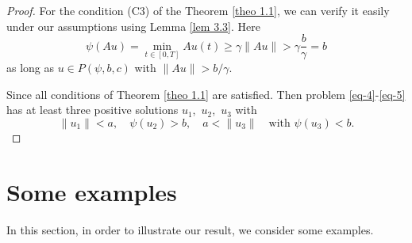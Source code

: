 \documentclass[reqno]{amsart}\usepackage{amsmath}
\begin{document}
\begin{proof}
For the condition {\rm (C3)} of the Theorem \ref{theo 1.1}, we can verify
it easily under our assumptions using Lemma \ref{lem 3.3}. Here
$$
\psi(Au)=\min_{t\in [0, T]} Au(t) \ge \gamma\|Au\|
        > \gamma \frac b\gamma = b
$$
as long as $u\in P(\psi, b, c)$ with $\|Au\|>b/\gamma$.

Since all conditions of Theorem \ref{theo 1.1} are satisfied. Then problem \eqref{eq-4}-\eqref{eq-5} has at least three positive solutions
$u_1$,\ $u_2$,\ $u_3$ with
$$
\|u_1\|<a,\quad\psi(u_2)>b,\quad a<\|u_3\|\quad\text{with }\psi(u_3)<b.
$$
\end{proof}

\section{Some examples}
In this section, in order to illustrate our result, we consider some examples.
\end{document}
